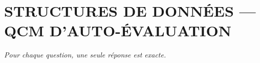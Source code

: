 
\section*{\textcolor{chapcolor}{\MakeUppercase{Structures de données — QCM d'auto-évaluation}}}

\begin{center}
\textit{Pour chaque question, une seule réponse est exacte.}
\end{center}

